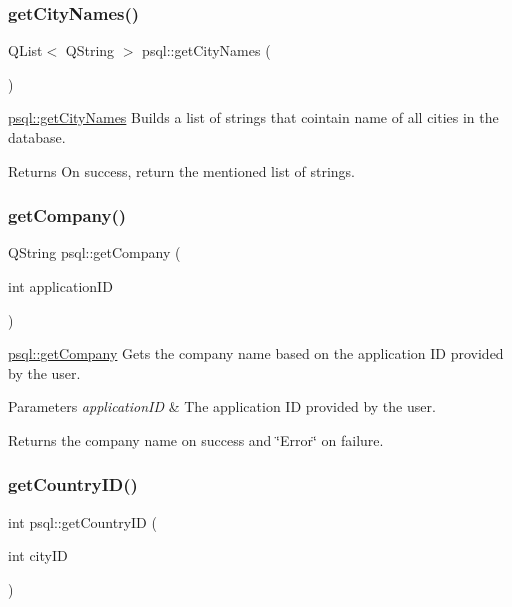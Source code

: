 \subsubsection{\texorpdfstring{get\+City\+Names()}{getCityNames()}}
{\footnotesize\ttfamily Q\+List$<$ Q\+String $>$ psql\+::get\+City\+Names (\begin{DoxyParamCaption}{ }\end{DoxyParamCaption})}



\mbox{\hyperlink{classpsql_a42ee0cf90055ba6a7a6f564cf04d8bb8}{psql\+::get\+City\+Names}} Builds a list of strings that cointain name of all cities in the database. 

\begin{DoxyReturn}{Returns}
On success, return the mentioned list of strings. 
\end{DoxyReturn}
\mbox{\label{classpsql_a09745cd03f09ffb2dacacaab4281915f}} 
\subsubsection{\texorpdfstring{get\+Company()}{getCompany()}}
{\footnotesize\ttfamily Q\+String psql\+::get\+Company (\begin{DoxyParamCaption}\item[{int}]{application\+ID }\end{DoxyParamCaption})}



\mbox{\hyperlink{classpsql_a09745cd03f09ffb2dacacaab4281915f}{psql\+::get\+Company}} Gets the company name based on the application ID provided by the user. 


\begin{DoxyParams}{Parameters}
{\em application\+ID} & The application ID provided by the user. \\
\hline
\end{DoxyParams}
\begin{DoxyReturn}{Returns}
the company name on success and \char`\"{}\+Error\char`\"{} on failure. 
\end{DoxyReturn}
\mbox{\label{classpsql_a81d02dc0350ba11d90257914078ba432}} 
\subsubsection{\texorpdfstring{get\+Country\+I\+D()}{getCountryID()}}
{\footnotesize\ttfamily int psql\+::get\+Country\+ID (\begin{DoxyParamCaption}\item[{int}]{city\+ID }\end{DoxyParamCaption})}



